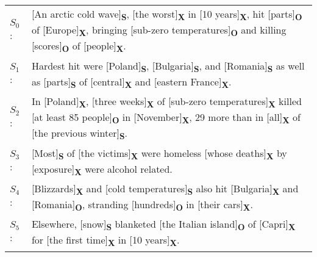 \begin{examples}
\label{ex:rel-text}
\begin{tabular}{l@{}p{12.5cm}}
 $S_0$: &[An arctic cold wave]\textbf{\textsubscript{S}}, [the worst]\textbf{\textsubscript{X}} in [10 years]\textbf{\textsubscript{X}}, hit [parts]\textbf{\textsubscript{O}} of [Europe]\textbf{\textsubscript{X}}, bringing [sub-zero temperatures]\textbf{\textsubscript{O}} and killing [scores]\textbf{\textsubscript{O}} of [people]\textbf{\textsubscript{X}}. \\

 $S_1$: & Hardest hit were [Poland]\textbf{\textsubscript{S}}, [Bulgaria]\textbf{\textsubscript{S}}, and [Romania]\textbf{\textsubscript{S}} as well as [parts]\textbf{\textsubscript{S}} of [central]\textbf{\textsubscript{X}} and [eastern France]\textbf{\textsubscript{X}}. \\

$S_2$: &In [Poland]\textbf{\textsubscript{X}}, [three weeks]\textbf{\textsubscript{X}} of [sub-zero temperatures]\textbf{\textsubscript{X}} killed [at least 85 people]\textbf{\textsubscript{O}} in [November]\textbf{\textsubscript{X}}, 29 more than in [all]\textbf{\textsubscript{X}} of [the previous winter]\textbf{\textsubscript{S}}. \\


$S_3$ : &[Most]\textbf{\textsubscript{S}} of [the victims]\textbf{\textsubscript{X}} were homeless [whose deaths]\textbf{\textsubscript{X}} by [exposure]\textbf{\textsubscript{X}} were alcohol related. \\

$S_4$: &[Blizzards]\textbf{\textsubscript{X}} and [cold temperatures]\textbf{\textsubscript{S}} also hit [Bulgaria]\textbf{\textsubscript{X}} and [Romania]\textbf{\textsubscript{O}}, stranding [hundreds]\textbf{\textsubscript{O}} in [their cars]\textbf{\textsubscript{X}}. \\

$S_5$: &Elsewhere, [snow]\textbf{\textsubscript{S}} blanketed [the Italian island]\textbf{\textsubscript{O}} of [Capri]\textbf{\textsubscript{X}} for [the first time]\textbf{\textsubscript{X}} in [10 years]\textbf{\textsubscript{X}}. 
\end{tabular}
\end{examples}


